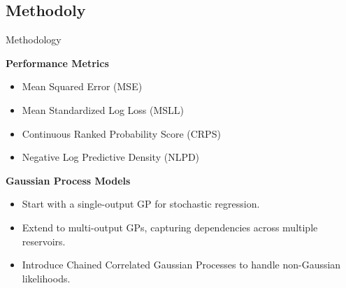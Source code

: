 \subsection{Methodoly}
\begin{frame}{Methodology}
	\justifying
	\begin{block}{\textbf{Performance Metrics}}
	\begin{itemize}
		\item Mean Squared Error (MSE)
		\item Mean Standardized Log Loss (MSLL)
		\item Continuous Ranked Probability Score (CRPS)
		\item Negative Log Predictive Density (NLPD)
	\end{itemize}
	\end{block}
	
	\begin{block}{\textbf{Gaussian Process Models}}
	\begin{itemize}
		\item Start with a single-output GP for stochastic regression.
		\item Extend to multi-output GPs, capturing dependencies across multiple reservoirs.
		\item Introduce Chained Correlated Gaussian Processes to handle non-Gaussian likelihoods.
	\end{itemize}
	\end{block}
\end{frame}

